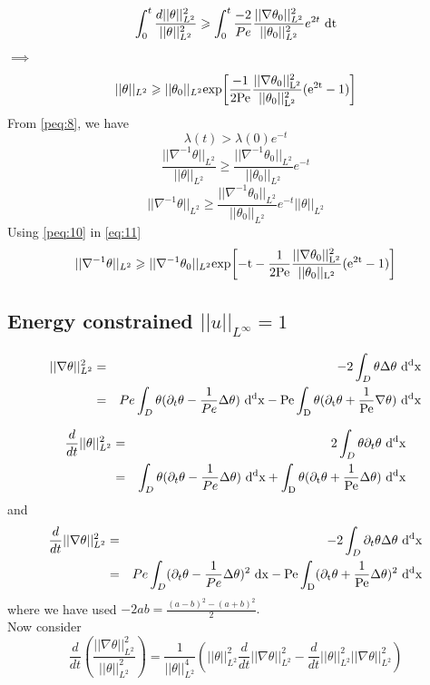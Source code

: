\documentclass[12pt]{report}   %
\renewcommand{\geq}{\geqslant}
\numberwithin{equation}{section}
\theoremstyle{plain}
\theoremstyle{definition}
\theoremstyle{remark}
\begin{document}
  \[\int_0^t \frac{d||\theta||_{L^2}^2}{||\theta||_{L^2}^2}  \geq \int_0^t \frac{-2}{Pe}\frac{||\nabla\theta_0||_{L^2}^2}{||\theta_0||_{L^2}^2}e^{2t}~\rm{d}t \]
  $\implies$
 \begin{equation}
||\theta||_{L^2} \geq ||\theta_0||_{L^2}\rm{exp}{\left[ \frac{-1}{2Pe}\frac{||\nabla\theta_0||_{L^2}^2}{||\theta_0||_{L^2}^2} (e^{2t} -1) \right]} \label{peq:10}
 \end{equation}
  From \eqref{peq:8}, we have 
 \[ \lambda(t) > \lambda(0)e^{-t}\]
 \[\frac{||\nabla^{-1}\theta||_{L^2}}{||\theta||_{L^2}} \geq \frac{||\nabla^{-1}\theta_0||_{L^2}}{||\theta_0||_{L^2}} e^{-t}\]
 \begin{equation}
  ||\nabla^{-1}\theta||_{L^2}  \geq \frac{||\nabla^{-1}\theta_0||_{L^2}}{||\theta_0||_{L^2}} e^{-t} ||\theta||_{L^2} \label{eq:11}
 \end{equation}
 Using \eqref{peq:10} in \eqref{eq:11}
 \[||\nabla^{-1}\theta||_{L^2} \geq ||\nabla^{-1}\theta_0||_{L^2} \rm{exp}{\left[-t-\frac{1}{2Pe}\frac{||\nabla\theta_0||_{L^2}^2}{||\theta_0||_{L^2}}(e^{2t}-1)\right]}\]

 \subsection{Energy constrained $||u||_{L^\infty} = 1$}
 \begin{eqnarray*}
 ||\nabla\theta||_{L^2}^2 &=& -2\int_D\theta\Delta\theta ~\rm{d}^dx \\
& = & Pe\int_D \theta(\partial_t\theta - \frac{1}{Pe}\Delta\theta) ~\rm{d}^dx - Pe\int_D
  \theta(\partial_t\theta + \frac{1}{Pe}\nabla\theta) ~\rm{d}^dx
 \end{eqnarray*}
 
  \begin{eqnarray*}
  \frac{d}{dt}||\theta||_{L^2}^2 &=& 2\int_D \theta\partial_t\theta ~\rm{d}^dx \\
 & = & \int_D \theta(\partial_t\theta -\frac{1}{Pe}\Delta\theta) ~\rm{d}^dx + \int_D \theta (\partial_t\theta+\frac{1}{Pe}\Delta\theta) ~\rm{d}^dx  
  \end{eqnarray*}
  and 
    \begin{eqnarray*}
 \frac{d}{dt}||\nabla\theta||_{L^2}^2 &=& -2\int_D\partial_t\theta\Delta\theta ~\rm{d}^dx \\
  &=& Pe\int_D (\partial_t\theta - \frac{1}{Pe}\Delta\theta)^2 ~\rm{d}x - Pe\int_D(\partial_t\theta+\frac{1}{Pe}\Delta\theta)^2 ~\rm{d}^dx 
   \end{eqnarray*}
   where we have used $-2ab = \frac{(a-b)^2 - (a+b)^2}{2}.$ \\
 Now consider 
\[ \frac{d}{dt}\left(\frac{||\nabla\theta||_{L^2}^2}{||\theta||_{L^2}^2}\right) = \frac{1}{||\theta||_{L^2}^4}\left( ||\theta||_{L^2}^2\frac{d}{dt}||\nabla\theta||_{L^2}^2 - \frac{d}{dt}||\theta||_{L^2}^2 ||\nabla\theta||_{L^2}^2   \right) \]
\end{document}

